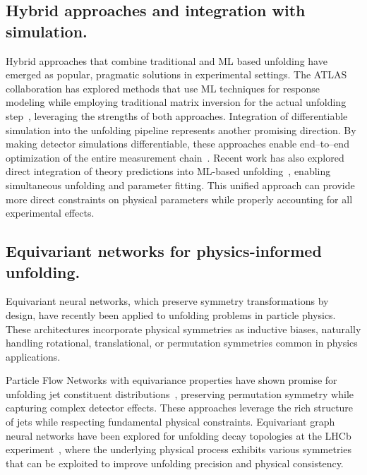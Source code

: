 \subsection{Hybrid approaches and integration with simulation.}
    Hybrid approaches that combine traditional and ML based unfolding have emerged as popular, pragmatic solutions in experimental settings.
    The ATLAS collaboration has explored methods that use ML techniques for response modeling while employing traditional matrix inversion for the actual unfolding step~\cite{GraphNeuralNetwork2022}, leveraging the strengths of both approaches.
    Integration of differentiable simulation into the unfolding pipeline represents another promising direction.
    By making detector simulations differentiable, these approaches enable end--to--end optimization of the entire measurement chain~\cite{MODE:2022znx,newburyReviewDifferentiableSimulators2024}.
    Recent work has also explored direct integration of theory predictions into ML-based unfolding~\cite{Huetsch:2024quz}, enabling simultaneous unfolding and parameter fitting.
    This unified approach can provide more direct constraints on physical parameters while properly accounting for all experimental effects.

\subsection{Equivariant networks for physics-informed unfolding.}
    Equivariant neural networks, which preserve symmetry transformations by design, have recently been applied to unfolding problems in particle physics.
    These architectures incorporate physical symmetries as inductive biases, naturally handling rotational, translational, or permutation symmetries common in physics applications.

    Particle Flow Networks with equivariance properties have shown promise for unfolding jet constituent distributions~\cite{andreassen_omnifold_2020}, preserving permutation symmetry while capturing complex detector effects. 
    These approaches leverage the rich structure of jets while respecting fundamental physical constraints.
    Equivariant graph neural networks have been explored for unfolding decay topologies at the LHCb experiment~\cite{Delaney:2023swp,GarciaPardinas:2023pmx,Correia:2025deq}, where the underlying physical process exhibits various symmetries that can be exploited to improve unfolding precision and physical consistency.

